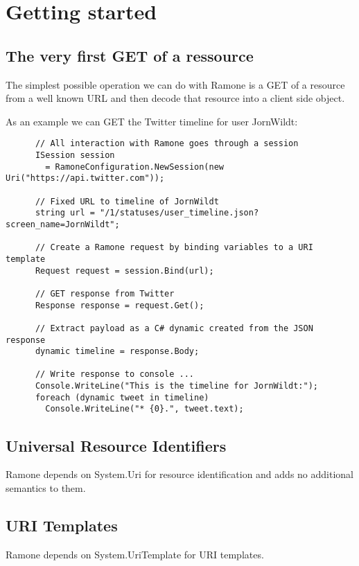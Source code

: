 \chapter{Getting started}

\section{The very first GET of a ressource}

The simplest possible operation we can do with Ramone is a GET of a resource 
from a well known URL and then decode that resource into a client side object.

As an example we can GET the Twitter timeline for user JornWildt:

\lstset{style=sharpc}
\begin{lstlisting}
      // All interaction with Ramone goes through a session
      ISession session
        = RamoneConfiguration.NewSession(new Uri("https://api.twitter.com"));

      // Fixed URL to timeline of JornWildt
      string url = "/1/statuses/user_timeline.json?screen_name=JornWildt";

      // Create a Ramone request by binding variables to a URI template
      Request request = session.Bind(url);

      // GET response from Twitter
      Response response = request.Get();

      // Extract payload as a C# dynamic created from the JSON response
      dynamic timeline = response.Body;

      // Write response to console ...
      Console.WriteLine("This is the timeline for JornWildt:");
      foreach (dynamic tweet in timeline)
        Console.WriteLine("* {0}.", tweet.text);
\end{lstlisting}




\section{Universal Resource Identifiers}

Ramone depends on System.Uri for resource identification and adds no additional semantics to them.


\section{URI Templates}

Ramone depends on System.UriTemplate for URI templates. 
